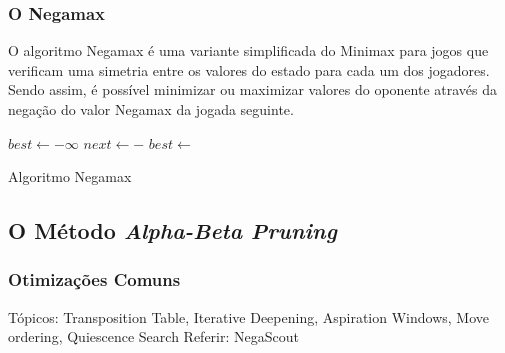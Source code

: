 \documentclass[12pt,a4paper,oneside]{article}
\begin{document}
\subsubsection{O Negamax}

O algoritmo Negamax é uma variante simplificada do Minimax para jogos que verificam uma simetria entre os valores do estado para cada um dos jogadores. Sendo assim, é possível minimizar ou maximizar valores do oponente através da negação do valor Negamax da jogada seguinte.

\begin{algorithm}
\begin{algorithmic}
 
   
  \EndIf
  \State $best \gets -\infty$
      \State $next \gets -$
      \State $best \gets$ 
  \EndFor
  \State{} 
\EndFunction
\end{algorithmic}
\caption{Algoritmo Negamax}
\end{algorithm}

\subsection{O Método \textit{Alpha-Beta Pruning}}

\lipsum[1]

\lipsum[2]

\lipsum[3]

\lipsum[4]

\lipsum[5]

\lipsum[6]

\subsubsection{Otimizações Comuns}


Tópicos: Transposition Table, Iterative Deepening, Aspiration Windows, Move ordering, Quiescence Search
Referir: NegaScout

\lipsum[1]

\lipsum[2]

\lipsum[3]

\lipsum[4]

\lipsum[5]
\end{document}
